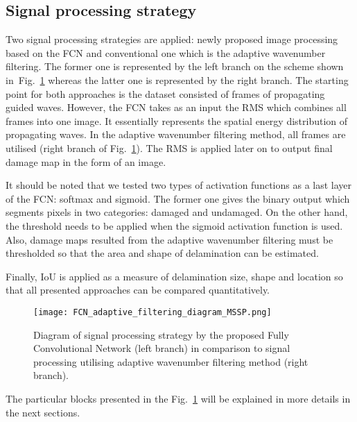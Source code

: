\subsection{Signal processing strategy}
Two signal processing strategies are applied: newly proposed image processing based on the FCN and conventional one which is the adaptive wavenumber filtering.
The former one is represented by the left branch on the scheme shown in~Fig.~\ref{fig:sig_proc_strategy} whereas the latter one is represented by the right branch.
The starting point for both approaches is the dataset consisted of frames of propagating guided waves.
However, the FCN takes as an input the RMS which combines all frames into one image. 
It essentially represents the spatial energy distribution of propagating waves.
In the adaptive wavenumber filtering method, all frames are utilised (right branch of Fig.~\ref{fig:sig_proc_strategy}).
The RMS is applied later on to output final damage map in the form of an image.

It should be noted that we tested two types of activation functions as a last layer of the FCN: softmax and sigmoid.
The former one gives the binary output which segments pixels in two categories: damaged and undamaged.
On the other hand, the threshold needs to be applied when the sigmoid activation function is used.
Also, damage maps resulted from the adaptive wavenumber filtering must be thresholded so that the area and shape of delamination can be estimated.

Finally, IoU is applied as a measure of delamination size, shape and location so that all presented approaches can be compared quantitatively. 
	\begin{figure}
		\centering
		\texttt{[image: FCN\_adaptive\_filtering\_diagram\_MSSP.png]}
		\caption{Diagram of signal processing strategy by the proposed Fully Convolutional Network (left branch) in comparison to signal processing utilising adaptive wavenumber filtering method (right branch). }
		\label{fig:sig_proc_strategy}
	\end{figure}
The particular blocks presented in the Fig.~\ref{fig:sig_proc_strategy} will be explained in more details in the next sections.